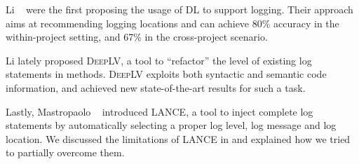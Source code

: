 Li \etal~\cite{li2020shall} were the first proposing the usage of DL to support logging. Their approach aims at recommending logging locations and can achieve 80\% accuracy in the within-project setting, and 67\% in the cross-project scenario.

Li \etal \cite{li2021deeplv} lately proposed \textsc{DeepLV}, a tool to ``refactor'' the level of existing log statements in \java methods. \textsc{DeepLV} exploits both syntactic and semantic code information, and achieved new state-of-the-art results for such a task.

Lastly, Mastropaolo \etal~\cite{mastropaolo2022using} introduced \textsc{LANCE}, a tool to inject complete log statements by automatically selecting a proper log level, log message and log location. We discussed the limitations of \textsc{LANCE} in  and explained how we tried to partially overcome them. 

%
%
%
